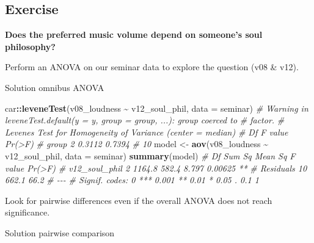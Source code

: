 \documentclass[
]{book}
\newenvironment{Shaded}{\begin{snugshade}}{\end{snugshade}}
\newcommand{\AttributeTok}[1]{\textcolor[rgb]{0.13,0.29,0.53}{#1}}
\newcommand{\CommentTok}[1]{\textcolor[rgb]{0.56,0.35,0.01}{\textit{#1}}}
\newcommand{\FunctionTok}[1]{\textcolor[rgb]{0.13,0.29,0.53}{\textbf{#1}}}
\newcommand{\NormalTok}[1]{#1}
\newcommand{\OtherTok}[1]{\textcolor[rgb]{0.56,0.35,0.01}{#1}}
\newcommand{\SpecialCharTok}[1]{\textcolor[rgb]{0.81,0.36,0.00}{\textbf{#1}}}
\begin{document}
\subsection{Exercise}\label{exercise-7}

\textbf{Does the preferred music volume depend on someone's soul philosophy?}

Perform an ANOVA on our seminar data to explore the question (v08 \& v12).

Solution omnibus ANOVA

\begin{Shaded}
\begin{Highlighting}[]
\NormalTok{car}\SpecialCharTok{::}\FunctionTok{leveneTest}\NormalTok{(v08\_loudness }\SpecialCharTok{\textasciitilde{}}\NormalTok{ v12\_soul\_phil, }\AttributeTok{data =}\NormalTok{ seminar)}
\CommentTok{\# Warning in leveneTest.default(y = y, group = group, ...): group coerced to}
\CommentTok{\# factor.}
\CommentTok{\# Levene\textquotesingle{}s Test for Homogeneity of Variance (center = median)}
\CommentTok{\#       Df F value Pr(\textgreater{}F)}
\CommentTok{\# group  2  0.3112 0.7394}
\CommentTok{\#       10}
\NormalTok{model }\OtherTok{\textless{}{-}} \FunctionTok{aov}\NormalTok{(v08\_loudness }\SpecialCharTok{\textasciitilde{}}\NormalTok{ v12\_soul\_phil, }\AttributeTok{data =}\NormalTok{ seminar)}
\FunctionTok{summary}\NormalTok{(model)}
\CommentTok{\#               Df Sum Sq Mean Sq F value  Pr(\textgreater{}F)   }
\CommentTok{\# v12\_soul\_phil  2 1164.8   582.4   8.797 0.00625 **}
\CommentTok{\# Residuals     10  662.1    66.2                   }
\CommentTok{\# {-}{-}{-}}
\CommentTok{\# Signif. codes:  0 \textquotesingle{}***\textquotesingle{} 0.001 \textquotesingle{}**\textquotesingle{} 0.01 \textquotesingle{}*\textquotesingle{} 0.05 \textquotesingle{}.\textquotesingle{} 0.1 \textquotesingle{} \textquotesingle{} 1}
\end{Highlighting}
\end{Shaded}

Look for pairwise differences even if the overall ANOVA does not reach significance.

Solution pairwise comparison

\begin{Shaded}
\end{Shaded}
\end{document}
